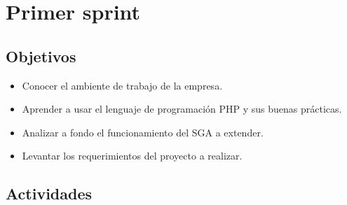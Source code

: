 \section{Primer sprint} %
\label{sec:primer_sprint}

\subsection{Objetivos}

\begin{itemize}
	\item Conocer el ambiente de trabajo de la empresa.
	\item Aprender a usar el lenguaje de programación PHP y sus buenas prácticas.
	\item Analizar a fondo el funcionamiento del SGA a extender.
	\item Levantar los requerimientos del proyecto a realizar.
\end{itemize}

\subsection{Actividades} %
\label{sub:actividades1}

